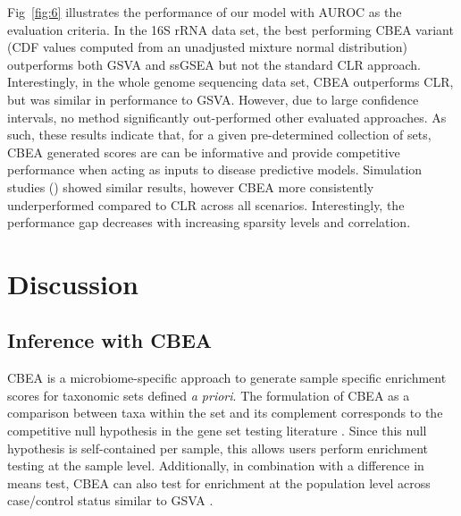 \documentclass[10pt,letterpaper]{article}
\begin{document}
Fig~\ref{fig:6} illustrates the performance of our model with AUROC as the evaluation criteria. In the 16S rRNA data set, the best performing CBEA variant (CDF values computed from an unadjusted mixture normal distribution) outperforms both GSVA and ssGSEA but not the standard CLR approach. Interestingly, in the whole genome sequencing data set, CBEA outperforms CLR, but was similar in performance to GSVA. However, due to large confidence intervals, no method significantly out-performed other evaluated approaches. As such, these results indicate that, for a given pre-determined collection of sets, CBEA generated scores are can be informative and provide competitive performance when acting as inputs to disease predictive models. Simulation studies () showed similar results, however CBEA more consistently underperformed compared to CLR across all scenarios. Interestingly, the performance gap decreases with increasing sparsity levels and correlation. 

\section*{Discussion}

\subsection*{Inference with CBEA} 
CBEA is a microbiome-specific approach to generate sample specific enrichment scores for taxonomic sets defined \emph{a priori}. The formulation of CBEA as a comparison between taxa within the set and its complement corresponds to the competitive null hypothesis in the gene set testing literature \cite{tian2005}. Since this null hypothesis is self-contained per sample, this allows users perform enrichment testing at the sample level. Additionally, in combination with a difference in means test, CBEA can also test for enrichment at the population level across case/control status similar to GSVA \cite{hanzelmann2013}.  
\end{document}
